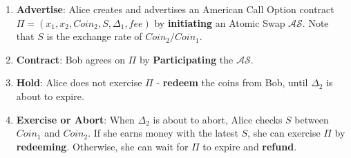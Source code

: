 \begin{enumerate}
    \item \textbf{Advertise}: Alice creates and advertises an American Call Option contract $\Pi = (x_1, x_2, Coin_2, S, \Delta_1, fee)$ by \textbf{initiating} an Atomic Swap $\mathcal{AS}$. Note that $S$ is the exchange rate of $Coin_2 / Coin_1$.
    \item \textbf{Contract}: Bob agrees on $\Pi$ by \textbf{Participating} the $\mathcal{AS}$.
    \item \textbf{Hold}: Alice does not exercise $\Pi$ - \textbf{redeem} the coins from Bob, until $\Delta_2$ is about to expire.
    \item \textbf{Exercise or Abort}: When $\Delta_2$ is about to abort, Alice checks $S$ between $Coin_1$ and $Coin_2$. If she earns money with the latest $S$, she can exercise $\Pi$ by \textbf{redeeming}. Otherwise, she can wait for $\Pi$ to expire and \textbf{refund}.
\end{enumerate}